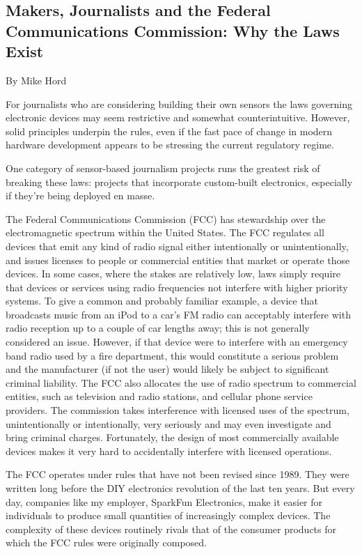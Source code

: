 \begin{itemize}
\chapter{Makers, Journalists and the Federal Communications Commission: Why the Laws Exist}
By Mike Hord

For journalists who are considering building their own sensors the laws
governing electronic devices may seem restrictive and somewhat counterintuitive.
However, solid principles underpin the rules, even if the fast pace
of change in modern hardware development appears to be stressing the
current regulatory regime.

One category of sensor-based journalism projects runs the greatest risk
of breaking these laws: projects that incorporate custom-built electronics,
especially if they're being deployed en masse.

The Federal Communications Commission (FCC) has stewardship over the
electromagnetic spectrum within the United States. The FCC regulates all
devices that emit any kind of radio signal either intentionally or unintentionally,
and issues licenses to people or commercial entities that market
or operate those devices. In some cases, where the stakes are relatively
low, laws simply require that devices or services using radio frequencies
not interfere with higher priority systems. To give a common and probably
familiar example, a device that broadcasts music from an iPod to a car's
FM radio can acceptably interfere with radio reception up to a couple of
car lengths away; this is not generally considered an issue. However, if that device were to interfere with an emergency band radio used by a fire department, this would constitute a serious problem and the manufacturer (if not
the user) would likely be subject to significant criminal liability.
The FCC also allocates the use of radio spectrum to commercial entities,
such as television and radio stations, and cellular phone service providers.
The commission takes interference with licensed uses of the spectrum,
unintentionally or intentionally, very seriously and may even investigate
and bring criminal charges. Fortunately, the design of most commercially
available devices makes it very hard to accidentally interfere with
licensed operations.

The FCC operates under rules that have not been revised since 1989. They
were written long before the DIY electronics revolution of the last ten years.
But every day, companies like my employer, SparkFun Electronics, make it
easier for individuals to produce small quantities of increasingly complex
devices. The complexity of these devices routinely rivals that of the consumer
products for which the FCC rules were originally composed.


\end{itemize}
